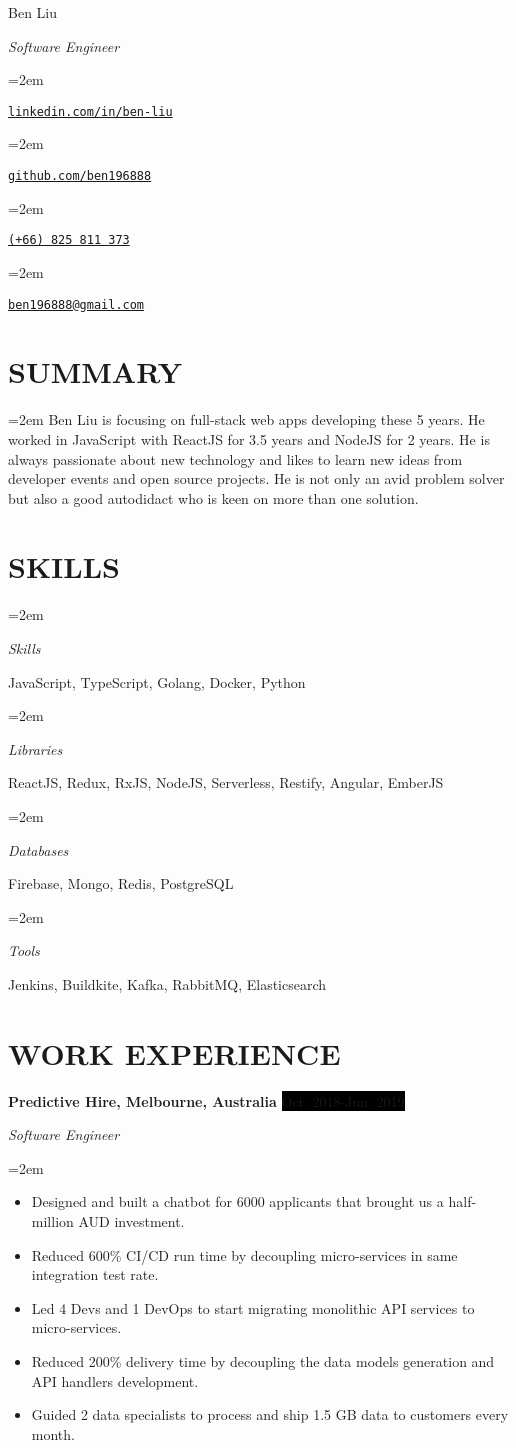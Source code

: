 \documentclass[a4paper, 11pt]{article}
\newlength{\spacebox}
\newcommand{\sepspace}{\vspace*{0.3em}}       %
\newcommand{\MyName}[1]{ %
        \noindent
		\Huge \usefont{OT1}{phv}{b}{n} #1
		\par \normalsize \normalfont}
\newcommand{\MySlogan}[1]{ %
		\noindent
		\large \usefont{OT1}{phv}{m}{n}\textit{#1}
		\par \normalsize \normalfont}
\newcommand{\NewPart}[1]{\section*{\uppercase{#1}}}
\newcommand{\PersonalEntry}[2]{
		\noindent\hangindent=2em\hangafter=0 %
		\parbox{\spacebox}{        %
		\hfill\textit{#1}}		       %
		\hfill\hspace{1.2em} #2 \par}    %
\newcommand{\SummaryEntry}[1]{
		\noindent\hangindent=2em\hangafter=0
		\noindent #1
		\normalsize \par}
\newcommand{\SkillsEntry}[2]{      %
		\noindent\hangindent=2em\hangafter=0 %
		\parbox{\spacebox}{        %
		\textit{#1}}			   %
		\hspace{1.2em} #2 \par}    %
\newcommand{\EducationEntry}[4]{
		\noindent \textbf{#1} \hfill      %
		\colorbox{White}{%
			\parbox{5cm}{%
			\hfill\color{Black}#2}} \par  %
		\noindent \textit{#3} \par        %
		\noindent\hangindent=2em\hangafter=0 \small #4 %
		\normalsize \par}
\newcommand{\WorkEntry}[4]{				  %
		\noindent \textbf{#1} \hfill      %
		\noindent\colorbox{Black}{\color{White}#2} \par  %
		\noindent \textit{#3} \par              %
		\noindent\hangindent=2em\hangafter=0 \small #4 %
		\normalsize \par}
\begin{document}
\parbox{0.35\textwidth}{
	\MyName{Ben Liu}
	\MySlogan{Software Engineer}
}
\parbox{0.6\textwidth}{

\PersonalEntry{}{\href{https://www.linkedin.com/in/ben-liu}{\texttt{linkedin.com/in/ben-liu}}}
\PersonalEntry{}{\href{https://github.com/ben196888}{\texttt{github.com/ben196888}}}
\PersonalEntry{}{\href{tel:+66-825-811-373}{\texttt{(+66) 825 811 373}}}
\PersonalEntry{}{\href{mailto:ben196888@gmail.com}{\texttt{ben196888@gmail.com}}}
}
\sepspace

\NewPart{Summary}{}

\SummaryEntry{%
Ben Liu is focusing on full-stack web apps developing these 5 years.
He worked in JavaScript with ReactJS for 3.5 years and NodeJS for 2 years.
He is always passionate about new technology and likes to learn new ideas from developer events and open source projects.
He is not only an avid problem solver but also a good autodidact who is keen on more than one solution.
}

\NewPart{Skills}{}

\SkillsEntry{Skills}    {JavaScript, TypeScript, Golang, Docker, Python}
\SkillsEntry{Libraries} {ReactJS, Redux, RxJS, NodeJS, Serverless, Restify, Angular, EmberJS}
\SkillsEntry{Databases} {Firebase, Mongo, Redis, PostgreSQL}
\SkillsEntry{Tools}     {Jenkins, Buildkite, Kafka, RabbitMQ, Elasticsearch}

\NewPart{Work Experience}{}

\WorkEntry{Predictive Hire, Melbourne, Australia}{Oct. 2018-Jun. 2019}{Software Engineer}{
\begin{itemize}
	\item {Designed and built a chatbot for 6000 applicants that brought us a half-million AUD investment.}
	\item {Reduced 600\% CI/CD run time by decoupling micro-services in same integration test rate.}
	\item {Led 4 Devs and 1 DevOps to start migrating monolithic API services to micro-services.}
	\item {Reduced 200\% delivery time by decoupling the data models generation and API handlers development.}
	\item {Guided 2 data specialists to process and ship 1.5 GB data to customers every month.}
\end{itemize}
}
\end{document}
